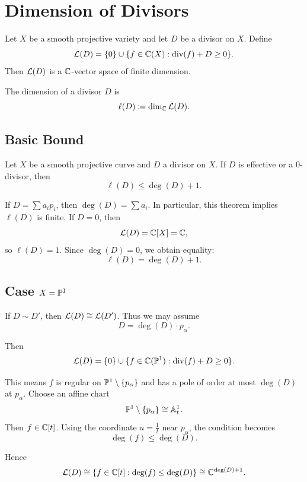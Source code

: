
\section{Dimension of Divisors}

Let $X$ be a smooth projective variety and let $D$ be a divisor on $X$.
Define
\[
    \mathcal{L}(D) = \{0\} \cup \{f \in \mathbb{C}(X) : \mathrm{div}(f) + D \geq 0\}.
\]
Then $\mathcal{L}(D)$ is a $\mathbb{C}$-vector space of finite dimension.

\begin{definition}
    The dimension of a divisor $D$ is
    \[
        \ell(D) \coloneqq \dim_{\mathbb{C}} \mathcal{L}(D).
    \]
\end{definition}

\subsection*{Basic Bound}

\begin{theorem*}{
    Let $X$ be a smooth projective curve and $D$ a divisor on $X$.
    If $D$ is effective or a $0$-divisor, then
    \[
        \ell(D) \leq \deg(D) + 1.
    \]
}
\end{theorem*}

If $D = \sum a_i p_i$, then $\deg(D) = \sum a_i$.
In particular, this theorem implies $\ell(D)$ is finite.
If $D = 0$, then
\[
    \mathcal{L}(D) = \mathbb{C}[X] = \mathbb{C},
\]
so $\ell(D) = 1$.
Since $\deg(D) = 0$, we obtain equality:
\[
    \ell(D) = \deg(D) + 1.
\]

\subsection*{Case $X = \mathbb{P}^1$}

If $D \sim D'$, then $\mathcal{L}(D) \cong \mathcal{L}(D')$.
Thus we may assume
\[
    D = \deg(D)\cdot p_\alpha.
\]

Then
\[
    \mathcal{L}(D)
    = \{0\} \cup \{f \in \mathbb{C}(\mathbb{P}^1) : \mathrm{div}(f) + D \geq 0\}.
\]

This means $f$ is regular on $\mathbb{P}^1 \setminus \{p_\alpha\}$ and has a pole of order at most $\deg(D)$ at $p_\alpha$.
Choose an affine chart
\[
    \mathbb{P}^1 \setminus \{p_\alpha\} \cong \mathbb{A}^1_t.
\]
Then $f \in \mathbb{C}[t]$.
Using the coordinate $u = \frac{1}{t}$ near $p_\alpha$, the condition becomes
\[
    \deg(f) \leq \deg(D).
\]

Hence
\[
    \mathcal{L}(D)
    \cong \{f \in \mathbb{C}[t] : \deg(f) \leq \deg(D)\}
    \cong \mathbb{C}^{\deg(D)+1}.
\]

